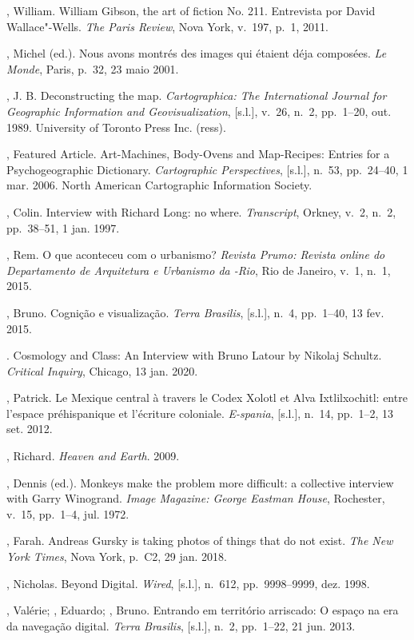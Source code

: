 \begin{bibliohedra}
, William. William Gibson, the art of fiction No. 211. Entrevista por David
Wallace"-Wells. \emph{The
Paris Review}, Nova York, v.~197, p.~1, 2011. 

, Michel (ed.). Nous avons montrés des images qui étaient déja
composées. \emph{Le Monde}, Paris, p.~32, 23 maio 2001.

, J. B. Deconstructing the map. \emph{Cartographica: The
International Journal for Geographic Information and Geovisualization},
{[}s.l.{]}, v.~26, n.~2, pp.~1--20, out. 1989. University of Toronto Press
Inc. (ress).

, Featured Article. Art-Machines, Body-Ovens and Map-Recipes:
Entries for a Psychogeographic Dictionary. \emph{Cartographic
Perspectives}, {[}s.l.{]}, n.~53, pp.~24--40, 1 mar. 2006. North American
Cartographic Information Society.

, Colin. Interview with Richard Long: no where.
\emph{Transcript}, Orkney, v.~2, n.~2, pp.~38--51, 1 jan. 1997.

, Rem. O que aconteceu com o urbanismo? \emph{Revista Prumo:
Revista online do Departamento de Arquitetura e Urbanismo da -Rio},
Rio de Janeiro, v.~1, n.~1, 2015.

, Bruno. Cognição e visualização. \emph{Terra Brasilis},
{[}s.l.{]}, n.~4, pp.~1--40, 13 fev. 2015.

\tit{\_\_\_\_\_\_}. Cosmology and Class: An Interview with Bruno Latour by Nikolaj Schultz. \emph{Critical Inquiry}, Chicago, 13 jan. 2020. 

, Patrick. Le Mexique central à travers le Codex Xolotl et Alva
Ixtlilxochitl: entre l'espace préhispanique et l'écriture coloniale.
\emph{E-spania}, {[}s.l.{]}, n.~14, pp.~1--2, 13 set. 2012. 

, Richard. \emph{Heaven and Earth}. 2009. 

, Dennis (ed.). Monkeys make the problem more difficult: a
collective interview with Garry Winogrand. \emph{Image Magazine:
George Eastman House}, Rochester, v.~15, pp.~1--4, jul. 1972.

, Farah. Andreas Gursky is taking photos of things that do not
exist. \emph{The New York Times}, Nova York, p.~C2, 29 jan. 2018.

, Nicholas. Beyond Digital. \emph{Wired}, {[}s.l.{]}, n.~612, pp.~9998--9999, dez. 1998.

, Valérie; , Eduardo; , Bruno. Entrando em
território arriscado: O espaço na era da navegação digital.
\emph{Terra Brasilis}, {[}s.l.{]}, n.~2, pp.~1--22, 21 jun. 2013. 


\end{bibliohedra}
